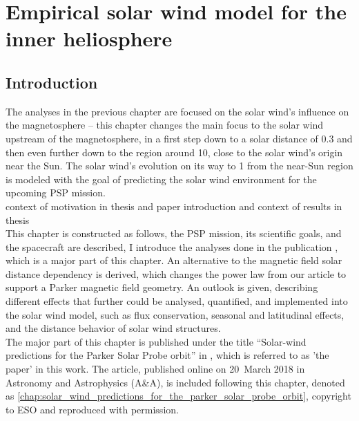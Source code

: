 
\chapter{Empirical solar wind model for the inner heliosphere}
\label{chap:empirical_solar_wind_model_for_the_inner_heliosphere}

\section{Introduction}

The analyses in the previous chapter are focused on the solar wind's influence on the magnetosphere -- this chapter changes the main focus to the solar wind upstream of the magnetosphere, in a first step down to a solar distance of \SI{0.3}{\au} and then even further down to the region around \SI{10}{\Rs}, close to the solar wind's origin near the Sun. The solar wind's evolution on its way to \SI{1}{\au} from the near-Sun region is modeled with the goal of predicting the solar wind environment for the upcoming PSP mission.\\

context of motivation in thesis and paper introduction and context of results in thesis\\

This chapter is constructed as follows, the PSP mission, its scientific goals, and the spacecraft are described, I introduce the analyses done in the publication \citet{Venzmer2018}, which is a major part of this chapter. An alternative to the magnetic field solar distance dependency is derived, which changes the power law from our article to support a Parker magnetic field geometry. An outlook is given, describing different effects that further could be analysed, quantified, and implemented into the solar wind model, such as flux conservation, seasonal and latitudinal effects, and the distance behavior of solar wind structures.\\


The major part of this chapter is published under the title ``Solar-wind predictions for the Parker Solar Probe orbit'' in \citet{Venzmer2018}, which is referred to as 'the paper' in this work. The article, published online on 20~March 2018 in Astronomy and Astrophysics (A\&A), is included following this chapter, denoted as \autoref{chap:solar_wind_predictions_for_the_parker_solar_probe_orbit}, copyright to ESO and reproduced with permission.

